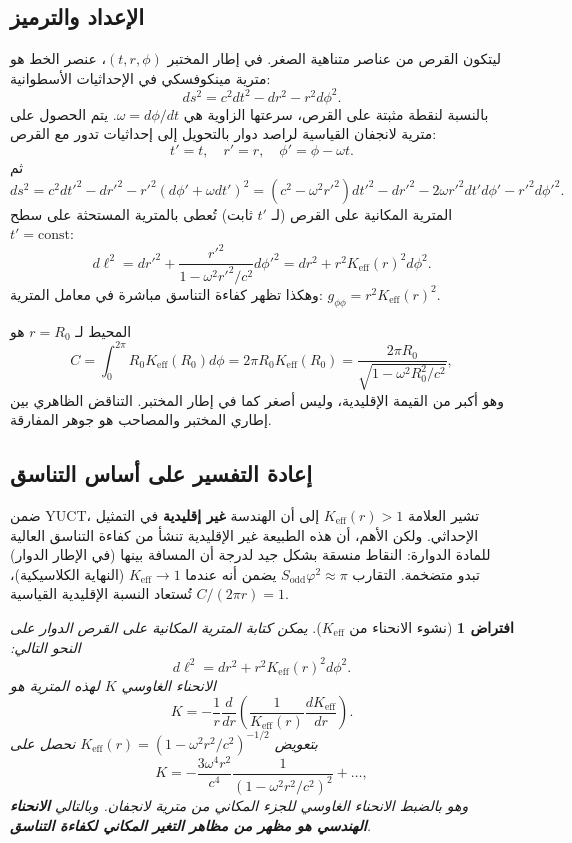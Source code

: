 \documentclass[12pt,a4paper]{article}
\newtheorem{proposition}{افتراض}[section]
\newcommand{\Sodd}{S_{\mathrm{odd}}}
\begin{document}
	\subsection{الإعداد والترميز}
	ليتكون القرص من عناصر متناهية الصغر. في إطار المختبر \((t, r, \phi)\)، عنصر الخط هو مترية مينكوفسكي في الإحداثيات الأسطوانية:
	\[
	ds^2 = c^2 dt^2 - dr^2 - r^2 d\phi^2.
	\]
	بالنسبة لنقطة مثبتة على القرص، سرعتها الزاوية هي \(\omega = d\phi/dt\). يتم الحصول على مترية لانجفان القياسية لراصد دوار بالتحويل إلى إحداثيات تدور مع القرص:
	\[
	t' = t,\quad r' = r,\quad \phi' = \phi - \omega t.
	\]
	ثم
	\[
	ds^2 = c^2 dt'^2 - dr'^2 - r'^2 (d\phi' + \omega dt')^2 = (c^2 - \omega^2 r'^2) dt'^2 - dr'^2 - 2\omega r'^2 dt' d\phi' - r'^2 d\phi'^2.
	\]
	المترية المكانية على القرص (لـ \(t'\) ثابت) تُعطى بالمترية المستحثة على سطح \(t' = \text{const}\):
	\[
	d\ell^2 = dr'^2 + \frac{r'^2}{1 - \omega^2 r'^2/c^2} d\phi'^2 = dr^2 + r^2 K_{\mathrm{eff}}(r)^2 d\phi^2.
	\]
	وهكذا تظهر كفاءة التناسق مباشرة في معامل المترية: \(g_{\phi\phi} = r^2 K_{\mathrm{eff}}(r)^2\).
	
	المحيط لـ \(r = R_0\) هو
	\[
	C = \int_0^{2\pi} R_0 K_{\mathrm{eff}}(R_0) d\phi = 2\pi R_0 K_{\mathrm{eff}}(R_0) = \frac{2\pi R_0}{\sqrt{1 - \omega^2 R_0^2/c^2}},
	\]
	وهو أكبر من القيمة الإقليدية، وليس أصغر كما في إطار المختبر. التناقض الظاهري بين إطاري المختبر والمصاحب هو جوهر المفارقة.
	
	\subsection{إعادة التفسير على أساس التناسق}
	ضمن YUCT، تشير العلامة \(K_{\mathrm{eff}}(r) > 1\) إلى أن الهندسة \textbf{غير إقليدية} في التمثيل الإحداثي. ولكن الأهم، أن هذه الطبيعة غير الإقليدية تنشأ من كفاءة التناسق العالية للمادة الدوارة: النقاط منسقة بشكل جيد لدرجة أن المسافة بينها (في الإطار الدوار) تبدو متضخمة. التقارب \(\Sodd \varphi^2 \approx \pi\) يضمن أنه عندما \(K_{\mathrm{eff}} \to 1\) (النهاية الكلاسيكية)، تُستعاد النسبة الإقليدية القياسية \(C/(2\pi r) = 1\).
	
	\begin{proposition}[نشوء الانحناء من \(K_{\mathrm{eff}}\)]
		يمكن كتابة المترية المكانية على القرص الدوار على النحو التالي:
		\[
		d\ell^2 = dr^2 + r^2 K_{\mathrm{eff}}(r)^2 d\phi^2.
		\]
		الانحناء الغاوسي \(K\) لهذه المترية هو
		\[
		K = -\frac{1}{r} \frac{d}{dr}\left( \frac{1}{K_{\mathrm{eff}}(r)} \frac{dK_{\mathrm{eff}}}{dr} \right).
		\]
		بتعويض \(K_{\mathrm{eff}}(r) = (1 - \omega^2 r^2/c^2)^{-1/2}\) نحصل على
		\[
		K = -\frac{3\omega^4 r^2}{c^4} \frac{1}{(1 - \omega^2 r^2/c^2)^2} + \dots,
		\]
		وهو بالضبط الانحناء الغاوسي للجزء المكاني من مترية لانجفان. وبالتالي \textbf{الانحناء الهندسي هو مظهر من مظاهر التغير المكاني لكفاءة التناسق}.
	\end{proposition}
	
\end{document}
